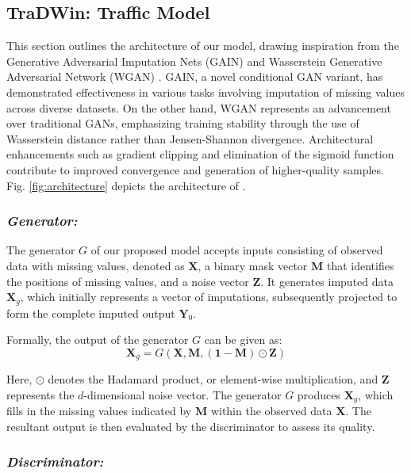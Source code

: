 \subsection{\textbf{TraDWin: Traffic Model}}

This section outlines the architecture of our \textit{\name} model, drawing inspiration from the Generative Adversarial Imputation Nets (GAIN) \cite{gain} and Wasserstein Generative Adversarial Network (WGAN) \cite{wgan}. GAIN, a novel conditional GAN variant, has demonstrated effectiveness in various tasks involving imputation of missing values across diverse datasets. On the other hand, WGAN represents an advancement over traditional GANs, emphasizing training stability through the use of Wasserstein distance rather than Jensen-Shannon divergence. Architectural enhancements such as gradient clipping and elimination of the sigmoid function contribute to improved convergence and generation of higher-quality samples. Fig. \ref{fig:architecture} depicts the architecture of \name.

\subsubsection{\textit{Generator:}}

The generator \( G \) of our proposed model accepts inputs consisting of observed data with missing values, denoted as \( \mathbf{X} \), a binary mask vector \( \mathbf{M} \) that identifies the positions of missing values, and a noise vector \( \mathbf{Z} \). It generates imputed data \( \mathbf{X}_g \), which initially represents a vector of imputations, subsequently projected to form the complete imputed output \( \mathbf{Y}_0 \).

Formally, the output of the generator \( G \) can be given as: 
\[ \mathbf{X}_g = G(\mathbf{X}, \mathbf{M}, (\mathbf{1}-\mathbf{M}) \odot \mathbf{Z}) \]

Here, \( \odot \) denotes the Hadamard product, or element-wise multiplication, and \( \mathbf{Z} \) represents the \( d \)-dimensional noise vector. The generator \( G \) produces \( \mathbf{X}_g \), which fills in the missing values indicated by \( \mathbf{M} \) within the observed data \( \mathbf{X} \). The resultant output is then evaluated by the discriminator to assess its quality.


\subsubsection{\textit{Discriminator:}}

